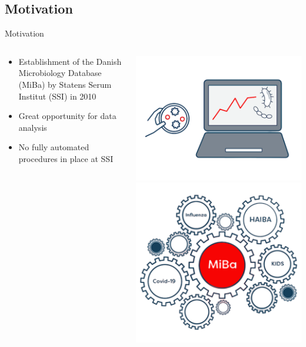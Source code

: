 \documentclass[aspectratio=169]{beamer}
\begin{document}
\hypertarget{motivation}{%
\subsection{Motivation}\label{motivation}}

\begin{frame}{Motivation}
\begin{columns}
\begin{column}{.58\textwidth}
\begin{itemize}
  \item Establishment of the Danish Microbiology Database (MiBa) by Statens Serum Institut (SSI) in 2010
  \item Great opportunity for data analysis
  \item No fully automated procedures in place at SSI
\end{itemize}
\end{column}
\hfill
\begin{column}{.38\textwidth}

 \tiny


\includegraphics[width=0.75\linewidth]{../figures/MiBaPetriComp} \includegraphics[width=0.75\linewidth]{../figures/MiBa} 

 \normalsize
\end{column}
\end{columns}
\end{frame}
\end{document}

